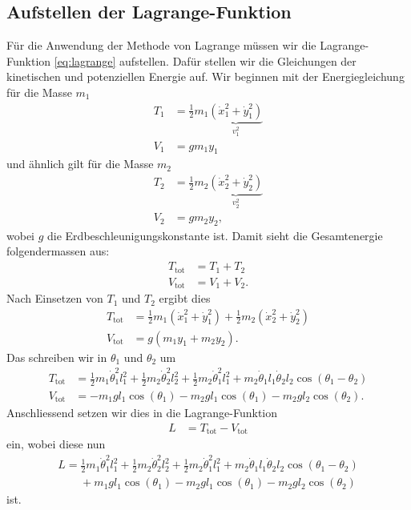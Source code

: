 \subsection{Aufstellen der Lagrange-Funktion}
Für die Anwendung der Methode von Lagrange müssen wir die Lagrange-Funktion 
\eqref{eq:lagrange} aufstellen.
Dafür stellen wir die Gleichungen der kinetischen und potenziellen Energie auf.
Wir beginnen mit der Energiegleichung für die Masse \(m_1\)
\begin{align*}
    T_1 &= \frac{1}{2} m_1 
    \underbrace{( \dot{x}_1^2 + \dot{y}_1^2 )}_{\displaystyle v_1^2}\\
    V_1 &= g m_1 y_1
\end{align*}
und ähnlich gilt für die Masse \(m_2\)
\begin{align*}
    T_2 &= \frac{1}{2} m_2 
    \underbrace{( \dot{x}_2^2 + \dot{y}_2^2 )}_{\displaystyle v_2^2}\\
    V_2 &= g m_2 y_2,
\end{align*}
wobei \(g\) die Erdbeschleunigungskonstante ist.
Damit sieht die Gesamtenergie folgendermassen aus:
\begin{align*}
    T_{\text{tot}} &= T_1 + T_2\\
    V_{\text{tot}} &= V_1 + V_2.
\end{align*}
Nach Einsetzen von \(T_1\) und \(T_2\) ergibt dies
\begin{align*}
    T_{\text{tot}} &= \frac{1}{2} m_1 ( \dot{x}_1^2 + \dot{y}_1^2 ) +
    \frac{1}{2} m_2 ( \dot{x}_2^2 + \dot{y}_2^2 )\\
    V_{\text{tot}} &= g ( m_1 y_1 + m_2 y_2 ).
\end{align*}
Das schreiben wir in \(\theta_1\) und \(\theta_2\) um
\begin{align*}
    T_{\text{tot}} &= \frac{1}{2} m_1 \dot{\theta}^2_1 l_1^2 + 
    \frac{1}{2} m_2 \dot{\theta}^2_2 l_2^2 + \frac{1}{2}
    m_2 \dot{\theta}^2_1 l_1^2 + 
    m_2 \dot{\theta}_1 l_1 \dot{\theta}_2 l_2 
    \cos(\theta_1 - \theta_2)\\
    V_{\text{tot}} &= -m_1 g l_1 \cos(\theta_1) -
    m_2 g l_1 \cos(\theta_1) -
    m_2 g l_2 \cos(\theta_2).
\end{align*}
Anschliessend setzen wir dies in die Lagrange-Funktion
\begin{align*}
    L &= T_{\text{tot}} - V_{\text{tot}}
\end{align*}
ein, wobei diese nun
\begin{align*}
    L = \frac{1}{2} m_1 \dot{\theta}^2_1 l_1^2 + 
    \frac{1}{2} m_2 \dot{\theta}^2_2 l_2^2 + \frac{1}{2}
    m_2 \dot{\theta}^2_1 l_1^2 + 
    m_2 \dot{\theta}_1 l_1 \dot{\theta}_2 l_2 
    \cos(\theta_1 - \theta_2)\\ \nonumber
    \qquad + m_1 g l_1 \cos(\theta_1) -
    m_2 g l_1 \cos(\theta_1) -
    m_2 g l_2 \cos(\theta_2)
\end{align*}
ist.

